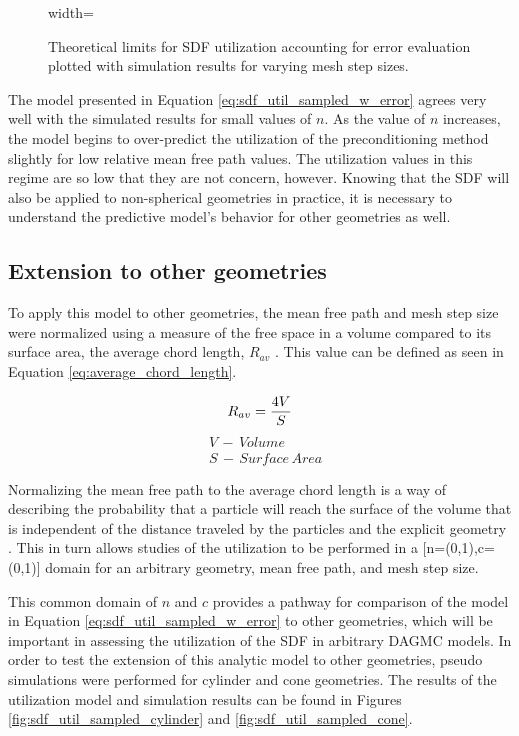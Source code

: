 \begin{figure}[H]
  \centering
  {width=\textwidth}
  \caption[Preconditioner utilization model including interpolation
    error.]{Theoretical limits for SDF utilization accounting for error
    evaluation plotted with simulation results for varying mesh step sizes.}
  \label{fig:sdf_util_sampled_distance_w_error}
\end{figure}

The model presented in Equation \eqref{eq:sdf_util_sampled_w_error} agrees very
well with the simulated results for small values of $n$. As the value of $n$
increases, the model begins to over-predict the utilization of the
preconditioning method slightly for low relative mean free path values. The
utilization values in this regime are so low that they are not concern,
however. Knowing that the SDF will also be applied to non-spherical geometries
in practice, it is necessary to understand the predictive model's behavior for
other geometries as well.

\subsection{Extension to other geometries}\label{sec:sdf_other_geoms}

To apply this model to other geometries, the mean free path and mesh step size
were normalized using a measure of the free space in a volume compared to its
surface area, the average chord length, $R_{av}$ \cite{Wigner_1981}.  This value
can be defined as seen in Equation \eqref{eq:average_chord_length}.

\begin{equation}
\centering
 R_{av} = \frac{4V}{S}
 \label{eq:average_chord_length}
\end{equation}
\begin{align*}
 &V \, - \, Volume \\
 &S \, - \, Surface \, Area
\end{align*}

Normalizing the mean free path to the average chord length is a way of
describing the probability that a particle will reach the surface of the volume
that is independent of the distance traveled by the particles and the explicit
geometry \cite{Mazzolo_2014}. This in turn allows studies of the utilization to
be performed in a [n=(0,1),c=(0,1)] domain for an arbitrary geometry, mean free
path, and mesh step size.

This common domain of $n$ and $c$ provides a pathway for comparison of the
model in Equation \eqref{eq:sdf_util_sampled_w_error} to other geometries, which
will be important in assessing the utilization of the SDF in arbitrary DAGMC
models. In order to test the extension of this analytic model to other
geometries, pseudo simulations were performed for cylinder and cone
geometries. The results of the utilization model and simulation results can be
found in Figures \ref{fig:sdf_util_sampled_cylinder} and
\ref{fig:sdf_util_sampled_cone}.

